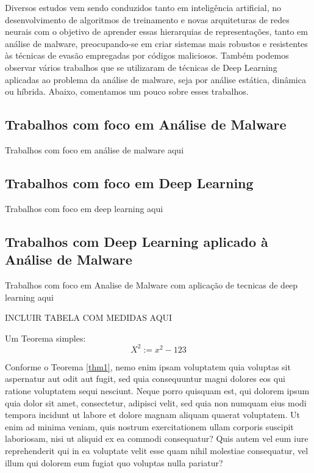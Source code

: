 Diversos estudos vem sendo conduzidos tanto em inteligência artificial, no desenvolvimento de algoritmos de treinamento e novas arquiteturas de redes neurais com o objetivo de aprender essas hierarquias de representações, tanto em análise de malware, preocupando-se em criar sistemas mais robustos e resistentes às técnicas de evasão empregadas por códigos maliciosos. Também podemos observar vários trabalhos que se utilizaram de técnicas de Deep Learning aplicadas ao problema da análise de malware, seja por análise estática, dinâmica ou híbrida. Abaixo, comentamos um pouco sobre esses trabalhos. 

\subsection{Trabalhos com foco em Análise de Malware}
Trabalhos com foco em análise de malware aqui

\subsection{Trabalhos com foco em Deep Learning}
Trabalhos com foco em deep learning aqui

\subsection{Trabalhos com Deep Learning aplicado à Análise de Malware}
Trabalhos com foco em Analise de Malware com aplicação de tecnicas de deep learning aqui

INCLUIR TABELA COM MEDIDAS AQUI

%
%
\begin{thm}
Um Teorema simples:
\begin{equation}
X^2 := x^2 - 123
\label{thm1}
\end{equation}
\end{thm}

\lipsum[13] 

%
Conforme o Teorema \ref{thm1}, nemo enim ipsam voluptatem quia voluptas sit aspernatur aut odit aut fugit, sed quia consequuntur magni dolores eos qui ratione voluptatem sequi nesciunt. Neque porro quisquam est, qui dolorem ipsum quia dolor sit amet, consectetur, adipisci velit, sed quia non numquam eius modi tempora incidunt ut labore et dolore magnam aliquam quaerat voluptatem. Ut enim ad minima veniam, quis nostrum exercitationem ullam corporis suscipit laboriosam, nisi ut aliquid ex ea commodi consequatur? Quis autem vel eum iure reprehenderit qui in ea voluptate velit esse quam nihil molestiae consequatur, vel illum qui dolorem eum fugiat quo voluptas nulla pariatur?


